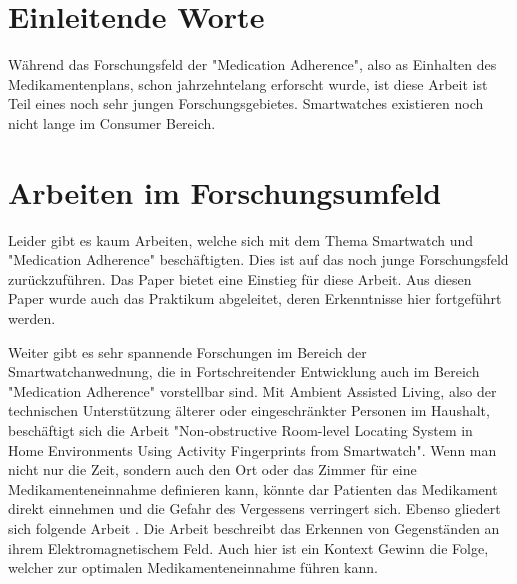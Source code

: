 

\section{Einleitende Worte}
Während das Forschungsfeld der "Medication Adherence", also as Einhalten des Medikamentenplans, schon jahrzehntelang erforscht wurde, ist diese Arbeit ist Teil eines noch sehr jungen Forschungsgebietes. Smartwatches existieren noch nicht lange im Consumer Bereich.
\section{Arbeiten im Forschungsumfeld}
Leider gibt es kaum Arbeiten, welche sich mit dem Thema Smartwatch und "Medication Adherence" beschäftigten. Dies ist auf das noch junge Forschungsfeld zurückzuführen. Das Paper \cite{Fabian-Sailer:2015aa} bietet eine Einstieg für diese Arbeit. Aus diesen Paper wurde auch das Praktikum abgeleitet, deren Erkenntnisse hier fortgeführt werden. 

Weiter gibt es sehr spannende Forschungen im Bereich der Smartwatchanwednung, die in Fortschreitender Entwicklung auch im Bereich "Medication Adherence" vorstellbar sind. Mit Ambient Assisted Living, also der technischen Unterstützung älterer oder eingeschränkter Personen im Haushalt, beschäftigt sich die Arbeit "Non-obstructive Room-level Locating System in Home Environments Using Activity Fingerprints from Smartwatch"\cite{Lee:2015:NRL:2750858.2804272}. Wenn man nicht nur die Zeit, sondern auch den Ort oder das Zimmer für eine Medikamenteneinnahme definieren kann, könnte dar Patienten das Medikament direkt einnehmen und die Gefahr des Vergessens verringert sich. Ebenso gliedert sich folgende Arbeit \cite{Laput:2015:ETR:2807442.2807481}. Die Arbeit beschreibt das Erkennen von Gegenständen an ihrem Elektromagnetischem Feld. Auch hier ist ein Kontext Gewinn die Folge, welcher zur optimalen Medikamenteneinnahme führen kann.

